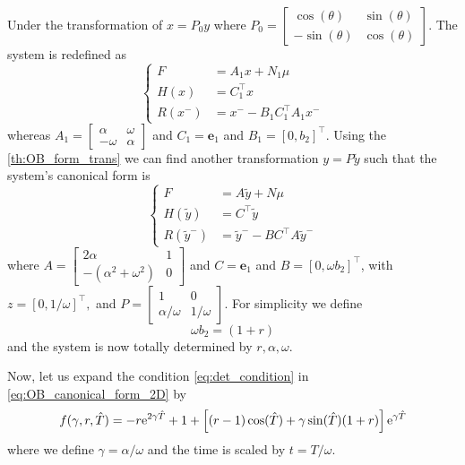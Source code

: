 \documentclass{article}
\begin{document}
Under the transformation of $x = P_0 y$ where 
$
P_0 = \begin{bmatrix}
	   \cos(\theta)   &  \sin(\theta) \\
	   - \sin(\theta) &  \cos(\theta)  
     \end{bmatrix}
$.
The system is redefined as 
\begin{equation}
	\begin{cases}
		F  & = A_1 x + N_1 \mu
		\\
		H(x) & = C_1^{\top}x  
		\\
		R(x^-) & = x^- - B_1 C_1^{\top} A_1x^-
	\end{cases}
\end{equation}
whereas 
$
A_1 = \begin{bmatrix}
	\alpha & \omega
	\\
	-\omega & \alpha
\end{bmatrix}
$
and 
$
C_1 = \mathbf{e}_1
$
and 
$
B_1 = [0,b_2]^{\top}
$.
Using the \cref{th:OB_form_trans} we can find another transformation $y = P \tilde{y}$ such that the system's canonical form is 
\begin{equation}
	\begin{cases}
		F  & = A \tilde{y} + N \mu
		\\
		H(\tilde{y})  & = C^{\top} \tilde{y} 
		\\
		R(\tilde{y}^-) & = \tilde{y}^- - B C^{\top}A\tilde{y}^-
	\end{cases}
\label{eq:OB_canonical_form_2D}
\end{equation}
where 
$
A = \begin{bmatrix}
	2 \alpha & 1
	\\
	-(\alpha^2 + \omega^2) & 0
\end{bmatrix}
$
and 
$
C = \mathbf{e}_1
$
and 
$
B = [0, \omega b_2]^{\top}
$, 
with 
$
z = [0, 1/\omega]^{\top},
$
and
$
P = \begin{bmatrix}
	1 & 0 
	\\
	\alpha/\omega & 1/\omega
\end{bmatrix}
$. For simplicity we define 
\[
\omega b_2 = (1 + r) 
\] 
and the system is now totally determined by $r, \alpha, \omega$.




Now, let us expand the  condition \cref{eq:det_condition} in \cref{eq:OB_canonical_form_2D} by 
\[
f(\gamma, r,\hat{T}) = -r {\rm e}^{2 \gamma \hat{T} } + 1 + \left[ (r - 1) \cos(\hat{T}) + \gamma \sin(\hat{T}) (1 + r)\right] {\rm e}^{\gamma \hat{T}}
\]
where we define $\gamma = \alpha/\omega$ and the time is scaled by $t = T/\omega$.
\end{document}
